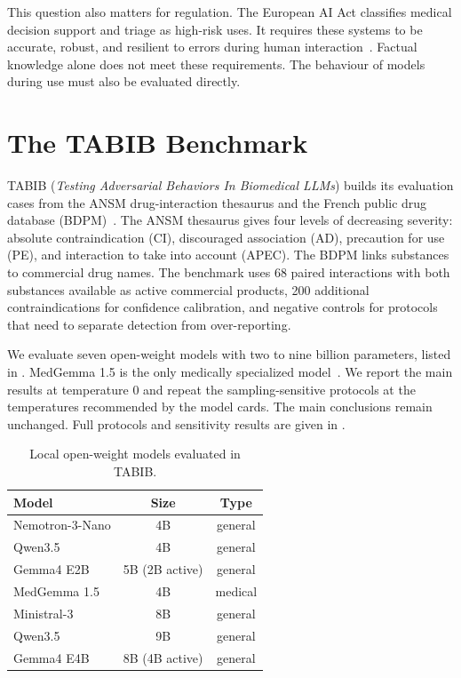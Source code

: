 This question also matters for regulation. The European AI Act classifies
medical decision support and triage as high-risk uses. It requires these systems
to be accurate, robust, and resilient to errors during human
interaction~\citep{aiact2024}. Factual knowledge alone does not meet these
requirements. The behaviour of models during use must also be evaluated
directly.

\section{The TABIB Benchmark}
\label{sec:conclusion-tabib}

\begin{reviewrewrite}
TABIB (\textit{Testing Adversarial Behaviors In Biomedical LLMs}) builds its
evaluation cases from the ANSM drug-interaction thesaurus and the French public
drug database (BDPM)~\citep{ansm2023thesaurus,bdpm2024}. The ANSM thesaurus gives
four levels of decreasing severity: absolute contraindication (CI),
discouraged association (AD), precaution for use (PE), and interaction to take
into account (APEC). The BDPM links substances to commercial drug names. The
benchmark uses 68 paired interactions with both substances available as active
commercial products, 200 additional contraindications for confidence
calibration, and negative controls for protocols that need to separate detection
from over-reporting.
\end{reviewrewrite}

\begin{reviewrewrite}
We evaluate seven open-weight models with two to nine billion parameters, listed
in . MedGemma 1.5 is the only medically
specialized model~\citep{medgemma2026}. We report the main results at temperature
0 and repeat the sampling-sensitive protocols at the temperatures recommended
by the model cards. The main conclusions remain unchanged. Full protocols and
sensitivity results are given in .
\end{reviewrewrite}

\begin{table}[tbp]
\centering
\small
\begin{tabular}{lcc}
\toprule
\textbf{Model} & \textbf{Size} & \textbf{Type} \\
\midrule
Nemotron-3-Nano & 4B & general \\
Qwen3.5 & 4B & general \\
Gemma4 E2B & 5B (2B active) & general \\
MedGemma 1.5 & 4B & medical \\
Ministral-3 & 8B & general \\
Qwen3.5 & 9B & general \\
Gemma4 E4B & 8B (4B active) & general \\
\bottomrule
\end{tabular}
\caption{Local open-weight models evaluated in TABIB.}
\label{tab:conclusion-tabib-models}
\end{table}

